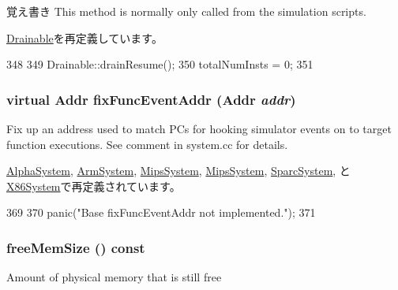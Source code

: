 \begin{DoxyNote}{覚え書き}
This method is normally only called from the simulation scripts. 
\end{DoxyNote}


\hyperlink{classDrainable_a8f020d3237536fe007fc488c4125c5d8}{Drainable}を再定義しています。


\begin{DoxyCode}
348 {
349     Drainable::drainResume();
350     totalNumInsts = 0;
351 }
\end{DoxyCode}
\hypertarget{classSystem_aff94f650c5eef23b8dc350ea755bdef4}{
\subsubsection[{fixFuncEventAddr}]{\setlength{\rightskip}{0pt plus 5cm}virtual {\bf Addr} fixFuncEventAddr ({\bf Addr} {\em addr})}}
\label{classSystem_aff94f650c5eef23b8dc350ea755bdef4}
Fix up an address used to match PCs for hooking simulator events on to target function executions. See comment in system.cc for details. 

\hyperlink{classAlphaSystem_ac72b76fe05499c31c7091ec5a56c0d52}{AlphaSystem}, \hyperlink{classArmSystem_aff94f650c5eef23b8dc350ea755bdef4}{ArmSystem}, \hyperlink{classMipsSystem_ac72b76fe05499c31c7091ec5a56c0d52}{MipsSystem}, \hyperlink{classMipsSystem_aff94f650c5eef23b8dc350ea755bdef4}{MipsSystem}, \hyperlink{classSparcSystem_aff94f650c5eef23b8dc350ea755bdef4}{SparcSystem}, と \hyperlink{classX86System_aff94f650c5eef23b8dc350ea755bdef4}{X86System}で再定義されています。


\begin{DoxyCode}
369     {
370         panic("Base fixFuncEventAddr not implemented.\n");
371     }
\end{DoxyCode}
\hypertarget{classSystem_a1c6da3f76011beef47b9bb74c1a0ec19}{
\subsubsection[{freeMemSize}]{ freeMemSize () const}}
\label{classSystem_a1c6da3f76011beef47b9bb74c1a0ec19}
Amount of physical memory that is still free 


